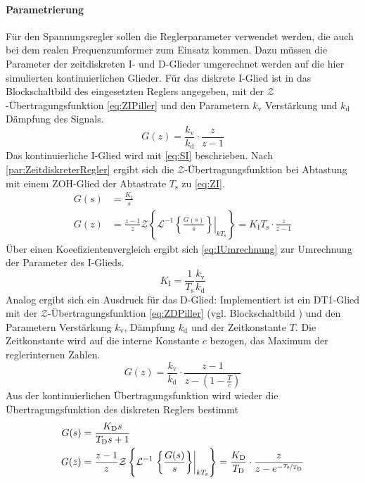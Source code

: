 \paragraph{Parametrierung} Für den Spannungsregler sollen die Reglerparameter verwendet werden, die auch bei dem realen Frequenzumformer zum Einsatz kommen. Dazu müssen die Parameter der zeitdiskreten I- und D-Glieder umgerechnet werden auf die hier simulierten kontinuierlichen Glieder. Für das diskrete I-Glied ist in \cite{piller_power_systems_piller_nodate} das Blockschaltbild des eingesetzten Reglers angegeben, mit der $\mathcal{Z}$-Übertragungsfunktion \cref{eq:ZIPiller} und den Parametern $k_\mathrm{v}$ Verstärkung und $k_\mathrm{d}$ Dämpfung des Signals.
\begin{equation}
	\label{eq:ZIPiller}
	G(z) = \frac{k_\mathrm{v}}{k_\mathrm{d}}\cdot\frac{z}{z-1}
\end{equation}
Das kontinuierliche I-Glied wird mit \cref{eq:SI} beschrieben. Nach \cref{par:ZeitdiskreterRegler} ergibt sich die $\mathcal{Z}$-Übertragungsfunktion bei Abtastung mit einem ZOH-Glied der Abtastrate $T_\mathrm{s}$ zu \cref{eq:ZI}.
\begin{align}
	G(s) &= \frac{K_\mathrm{I}}{s} \label{eq:SI}\\
	G(z) &= \frac{z-1}{z} \mathcal{Z}\left\{ \mathcal{L}^{-1}\left.\left\{\frac{G(s)}{s}\right\}\right|_{kT_{\mathrm{s}}} \right\} = K_\mathrm{I}T_\mathrm{s}\cdot\frac{z}{z-1} \label{eq:ZI}
\end{align}
Über einen Koeefizientenvergleich ergibt sich \cref{eq:IUmrechnung} zur Umrechnung der Parameter des I-Glieds.
\begin{equation}
	K_\mathrm{I} = \frac{1}{T_\mathrm{s}}\frac{k_\mathrm{v}}{k_\mathrm{d}}\label{eq:IUmrechnung}
\end{equation}
Analog ergibt sich ein Ausdruck für das D-Glied: Implementiert ist ein DT1-Glied mit der $\mathcal{Z}$-Übertragungsfunktion \cref{eq:ZDPiller} (vgl. Blockschaltbild \cite{piller_power_systems_piller_nodate}) und den Parametern Verstärkung $k_\mathrm{v}$, Dämpfung $k_\mathrm{d}$ und der Zeitkonstante $T$. Die Zeitkonstante wird auf die interne Konstante $c$ bezogen, das Maximum der reglerinternen Zahlen.
\begin{equation}
	G(z) = \frac{k_\mathrm{v}}{k_\mathrm{d}}\cdot\frac{z-1}{z-(1-\frac{T}{c})}\label{eq:ZDPiller}
\end{equation}
Aus der kontinuierlichen Übertragungsfunktion wird wieder die Übertragungsfunktion des diskreten Reglers bestimmt 
\begin{align}
	G(s) &= \frac{K_\mathrm{D}s}{T_\mathrm{D}s+1}\label{eq:SD}\\
	G(z) &= \frac{z-1}{z} \mathcal{Z}\left\{ \mathcal{L}^{-1}\left.\left\{\frac{G(s)}{s}\right\}\right|_{kT_{\mathrm{s}}} \right\} = \frac{K_\mathrm{D}}{T_\mathrm{D}}\cdot\frac{z}{z-e^{-\nicefrac{T_\mathrm{s}}{T_\mathrm{D}}}}\label{eq:ZD}
\end{align}
